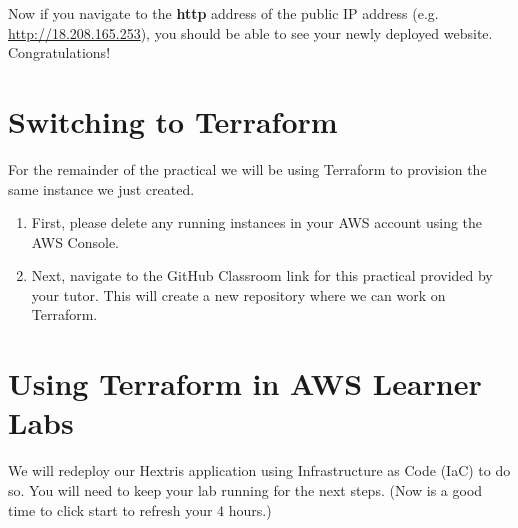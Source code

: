\documentclass{csse4400}
\begin{document}
Now if you navigate to the \textbf{http} address of the public IP address (e.g. \url{http://18.208.165.253}), you should be able to see your newly deployed website.
Congratulations!




\section{Switching to Terraform}

For the remainder of the practical we will be using Terraform to provision the same instance we just created.

\begin{enumerate}
    \item First, please delete any running instances in your AWS account using the AWS Console.
    \item Next, navigate to the GitHub Classroom link for this practical provided by your tutor.
    This will create a new repository where we can work on Terraform.
\end{enumerate}


\section{Using Terraform in AWS Learner Labs}
We will redeploy our Hextris application using Infrastructure as Code (IaC) to do so.
You will need to keep your lab running for the next steps.
(Now is a good time to click start to refresh your 4 hours.)
\end{document}
